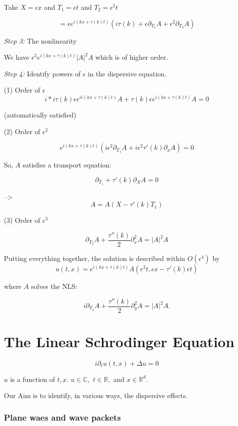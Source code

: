 \documentclass[11pt]{amsart}
\theoremstyle{plain}
\numberwithin{equation}{section}
\theoremstyle{remark}
\newcommand{\C}{\mathbb{C}}
\newcommand{\R}{\mathbb{R}}
\begin{document}
Take $X=\epsilon x$ and $T_1 = \epsilon t$ and $T_2= \epsilon^2 t$

$$= \epsilon e^{i(kx+\tau(k)t)} (i\tau(k)+\epsilon \partial_{T_1} A +\epsilon^2 \partial_{T_2} A) $$

\emph{Step 3:} The nonlinearity

We have $\epsilon^3 e^{i (kx +\tau (k)t)} |A|^2 A$  which is of higher order.

\emph{Step 4:} Identify powers of $\epsilon$ in the dispersive equation. 

(1) Order of $\epsilon$
$$ i*i \tau(k) \epsilon e^{ii (kx +\tau (k)t)} A +\tau(k) \epsilon e^{i (kx +\tau (k)t)}A =0$$

(automatically satisfied)

(2) Order of $\epsilon^2$

$$e^{i (kx +\tau (k)t)} ( i\epsilon^2 \partial_{T_1} A +i\epsilon^2 \tau'(k) \partial_x A)=0$$

So, $A$ satisfies a transport equation: 

$$\partial_{T_1} +\tau'(k) \partial_{X} A=0$$

--> $$A=A(X-\tau'(k)T_1)$$

(3) Order of $\epsilon^3$

$$\partial_{T_2} A + \frac{\tau''(k)}{2} \partial_{x}^2 A = |A|^2 A$$

Putting everything together, the solution is described within $O(\epsilon^4)$ by $$u(t,x)= e^{i (kx +\tau (k)t)} A(\epsilon^2 t, \epsilon x -\tau'(k) \epsilon t)$$

where $A$ solves the NLS:

$$ i \partial_{T_2} A + \frac{\tau''(k)}{2} \partial_{y}^2 A = |A|^2 A.$$



\part{The Linear Schrodinger Equation}

$$i\partial_{t} u(t,x) + \Delta u=0$$

$u$ is a function of $t, x.$ $u\in \C,$ $t\in \R,$ and $x\in \R^d.$  

Our Aim is to identify, in various ways, the dispersive effects.

\section{Plane waes and wave packets}
\end{document}
